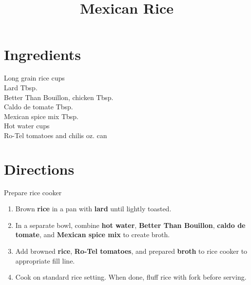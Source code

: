\documentclass[11pt,letterpaper]{article}
\title{Mexican Rice}
\author{}
\date{}
\begin{document}
\maketitle
\thispagestyle{empty}

\section*{Ingredients}
\setlength{\columnsep}{20pt}
\begin{multicols}{2}
\noindent
    Long grain rice  cups \\
    Lard  Tbsp. \\
    Better Than Bouillon, chicken  Tbsp. \\
    Caldo de tomate  Tbsp. \\
    Mexican spice mix  Tbsp. \\
    Hot water  cups \\
    Ro-Tel tomatoes and chilis  oz. can
\end{multicols}

\section*{Directions}

\noindent
Prepare rice cooker

\begin{enumerate}
    \item Brown \textbf{rice} in a pan with \textbf{lard} until lightly toasted.
    
    \item In a separate bowl, combine \textbf{hot water}, \textbf{Better Than Bouillon}, \textbf{caldo de tomate}, and \textbf{Mexican spice mix} to create broth.
    
    \item Add browned \textbf{rice}, \textbf{Ro-Tel tomatoes}, and prepared \textbf{broth} to rice cooker to appropriate fill line.
    
    \item Cook on standard rice setting. When done, fluff rice with fork before serving.
\end{enumerate}
\end{document}
